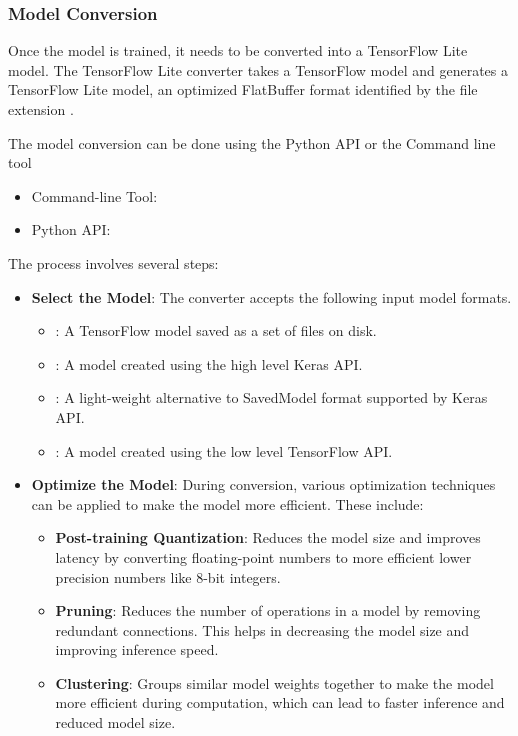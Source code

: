 \subsubsection{Model Conversion}
Once the model is trained, it needs to be converted into a TensorFlow Lite model. The TensorFlow Lite converter takes a TensorFlow model and generates a TensorFlow Lite model, an optimized FlatBuffer format identified by the file extension .

The model conversion can be done using the Python API or the Command
line tool
\begin{itemize}
    \item Command-line Tool: 
    \item Python API: 
\end{itemize}

The process involves several steps:
\begin{itemize}
    \item \textbf{Select the Model}: The converter accepts the following input model formats.
    \begin{itemize}
        \item {}: A TensorFlow model saved as a set of files on disk.
        \item {}: A model created using the high level Keras API.
        \item {}: A light-weight alternative to SavedModel format supported by Keras API.
        \item {}: A model created using the low level TensorFlow API.
    \end{itemize}
    
    \item \textbf{Optimize the Model}: During conversion, various optimization techniques can be applied to make the model more efficient. These include:
    \begin{itemize}
        \item \textbf{Post-training Quantization}: Reduces the model size and improves latency by converting floating-point numbers to more efficient lower precision numbers like 8-bit integers.
        \item \textbf{Pruning}: Reduces the number of operations in a model by removing redundant connections. This helps in decreasing the model size and improving inference speed.
        \item \textbf{Clustering}: Groups similar model weights together to make the model more efficient during computation, which can lead to faster inference and reduced model size.
    \end{itemize}
\end{itemize}

